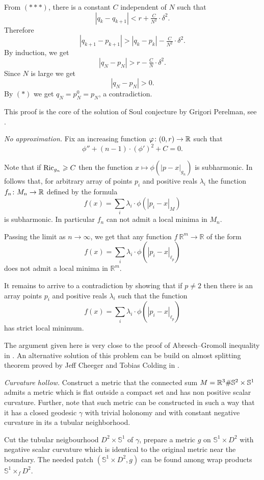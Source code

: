 From $({*}{*}{*})$, there is a constant $C$ independent of $N$ such that
\[|q_k-q_{k+1}|<r+\tfrac C{N^2}\cdot\delta^2.\]
Therefore 
\[|q_{k+1}-p_{k+1}|>|q_k-p_k|-\tfrac C{N^2}\cdot\delta^2.\]
By induction, we get 
\[|q_N-p_N|>r-\tfrac C{N}\cdot\delta^2.\]
Since $N$ is large we get
\[|q_N-p_N|>0.\]
By $({*})$ we get $q_N=p_N^0=p_N$, a contradiction.

This proof is the core of the solution of Soul conjecture
by Grigori Perelman, 
see \cite{perelman}.

\textit{No approximation.}
Fix an increasing function $\varphi\colon(0,r)\to \mathbb{R}$
such that 
\[\phi''+(n-1)\cdot(\phi')^2+C=0.\]

Note that if $\operatorname{\rm Ric}_{g_n}\geqslant C$ then the function 
$x\mapsto\phi(|p-x|_{g_n})$ is subharmonic.
In follows that, 
for arbitrary array of points $p_i$ 
and positive reals $\lambda_i$ the function $f_n\colon M_n\to \mathbb{R}$
defined by the formula
$$f(x)=\sum_i\lambda_i\cdot\phi(|p_i-x|_M)$$
is subharmonic.
In particular $f_n$ can not admit a local minima in $M_n$.

Passing the limit as $n\to \infty$, we get that any function $f\:\mathbb{R}^m\to\mathbb{R}$
of the form 
$$f(x)=\sum_i\lambda_i\cdot\phi(|p_i-x|_{\ell_p})$$
does not admit a local minima in $\mathbb{R}^m$.

It remains to arrive to a contradiction
by showing that if $p\ne 2$ then there is an array
points $p_i$ and positive reals $\lambda_i$
such that the function 
$$f(x)=\sum_i\lambda_i\cdot\phi(|p_i-x|_{\ell_p})$$
has strict local minimum.

 The argument given here is very close to the proof of Abresch--Gromoll inequality in \cite{abresch-gromoll}.
An alternative solution of this problem can be build on almost splitting theorem proved by  Jeff Cheeger and Tobias Colding in \cite{cheeger-colding}.


\textit{Curvature hollow.}
Construct a metric that the connected sum
$M=\mathbb{R}^3\#\mathbb{S}^2\times\mathbb{S}^1$ admits a metric which is flat outside a compact set and has non positive scalar curvature.
Further, note that such metric can be constructed in such a way that it has a closed geodesic $\gamma$ with trivial holonomy and with constant negative curvature in its a tubular neighborhood.

Cut the tubular neigbourhood $D^2\times \mathbb{S}^1$ of $\gamma$, 
prepare a metric $g$ on $\mathbb{S}^1\times D^2$ with negative scalar curvature which 
is identical to the original metric near the boundary.
The needed patch $(\mathbb{S}^1\times D^2,g)$ can be found among wrap products $\mathbb{S}^1\times_f D^2$.

